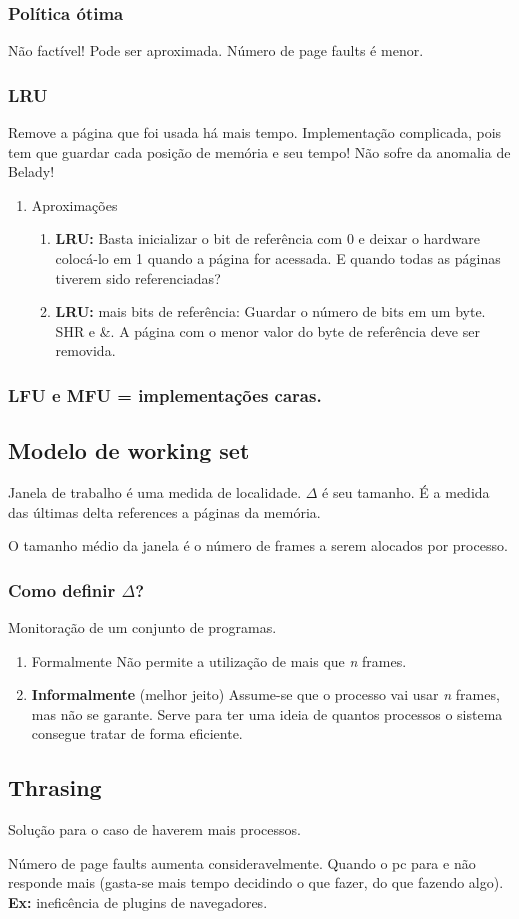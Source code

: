 \documentclass[11pt]{article}
\begin{document}
\subsubsection{Política ótima}
\label{sec:orge6106c5}
Não factível! Pode ser aproximada. Número de page faults é menor.

\subsubsection{LRU}
\label{sec:orga23b587}
Remove a página que foi usada há mais tempo. Implementação complicada, pois tem que
guardar cada posição de memória e seu tempo! Não sofre da anomalia de Belady!
\begin{enumerate}
\item Aproximações
\label{sec:org89ee822}
\begin{enumerate}
\item \textbf{LRU:} Basta inicializar o bit de referência com 0 e deixar o hardware colocá-lo em 1 quando
a página for acessada. E quando todas as páginas tiverem sido referenciadas?
\item \textbf{LRU:} mais bits de referência: Guardar o número de bits em um byte. SHR e \&. A página com o menor valor do byte
de referência deve ser removida.
\end{enumerate}
\end{enumerate}


\subsubsection{LFU e MFU = implementações caras.}
\label{sec:org3d33f2a}

\subsection{Modelo de working set}
\label{sec:org107cd58}
Janela de trabalho é uma medida de localidade. \(\Delta\) é seu tamanho. É a medida das
últimas delta references a páginas da memória.

O tamanho médio da janela é o número de frames a serem alocados por processo.

\subsubsection{Como definir \(\Delta\)?}
\label{sec:orgb17268a}
Monitoração de um conjunto de programas.

\begin{enumerate}
\item Formalmente Não permite a utilização de mais que \emph{n} frames.
\item \textbf{Informalmente} (melhor jeito) Assume-se que o processo vai usar \emph{n} frames, mas não se garante.
Serve para ter uma ideia de quantos processos o sistema consegue tratar de forma eficiente.
\end{enumerate}

\subsection{Thrasing}
\label{sec:org2b1a2fb}
Solução para o caso de haverem mais processos.

Número de page faults aumenta consideravelmente. Quando o pc para e não responde mais
(gasta-se mais tempo decidindo o que fazer, do que fazendo algo). \textbf{Ex:} ineficência de
plugins de navegadores.
\end{document}
